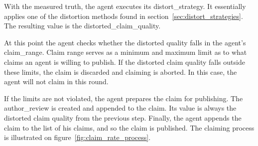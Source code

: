 \documentclass[%
    ]{\PathToTumTemplate/thesis/tum_thesis}
\begin{document}
With the measured truth, the agent executes its \gls{distort_strategy}.
It essentially applies one of the distortion methods found in section~\ref{sec:distort_strategies}.
The resulting value is the \gls{distorted_claim_quality}.

At this point the agent checks whether the distorted quality falls in the agent's \gls{claim_range}.
Claim range serves as a minimum and maximum limit as to what claims an agent is willing to publish.
If the distorted claim quality falls outside these limits, the claim is discarded and claiming is aborted.
In this case, the agent will not claim in this round.

If the limits are not violated, the agent prepares the claim for publishing.
The \gls{author_review} is created and appended to the claim.
Its value is always the distorted claim quality from the previous step.
Finally, the agent appends the claim to the list of his claims, and so the claim is published.
The claiming process is illustrated on figure~\ref{fig:claim_rate_process}.
\end{document}

